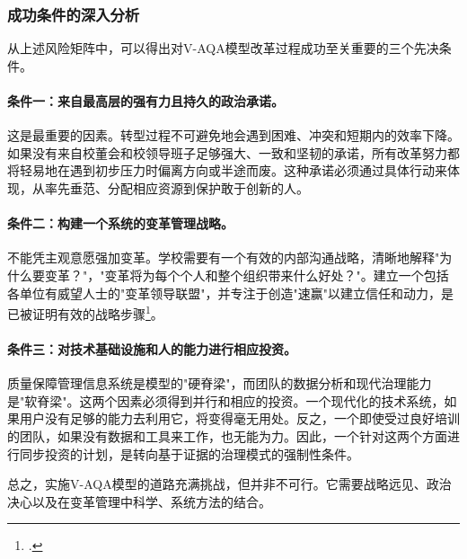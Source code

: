 \subsubsection{成功条件的深入分析}

从上述风险矩阵中，可以得出对V-AQA模型改革过程成功至关重要的三个先决条件。

\paragraph{条件一：来自最高层的强有力且持久的政治承诺。}
这是最重要的因素。转型过程不可避免地会遇到困难、冲突和短期内的效率下降。如果没有来自校董会和校领导班子足够强大、一致和坚韧的承诺，所有改革努力都将轻易地在遇到初步压力时偏离方向或半途而废。这种承诺必须通过具体行动来体现，从率先垂范、分配相应资源到保护敢于创新的人。

\paragraph{条件二：构建一个系统的变革管理战略。}
不能凭主观意愿强加变革。学校需要有一个有效的内部沟通战略，清晰地解释"为什么要变革？"，"变革将为每个个人和整个组织带来什么好处？"。建立一个包括各单位有威望人士的"变革领导联盟"，并专注于创造"速赢"以建立信任和动力，是已被证明有效的战略步骤\footcite{kotter_1996}。

\paragraph{条件三：对技术基础设施和人的能力进行相应投资。}
质量保障管理信息系统是模型的"硬脊梁"，而团队的数据分析和现代治理能力是"软脊梁"。这两个因素必须得到并行和相应的投资。一个现代化的技术系统，如果用户没有足够的能力去利用它，将变得毫无用处。反之，一个即使受过良好培训的团队，如果没有数据和工具来工作，也无能为力。因此，一个针对这两个方面进行同步投资的计划，是转向基于证据的治理模式的强制性条件。

总之，实施V-AQA模型的道路充满挑战，但并非不可行。它需要战略远见、政治决心以及在变革管理中科学、系统方法的结合。












